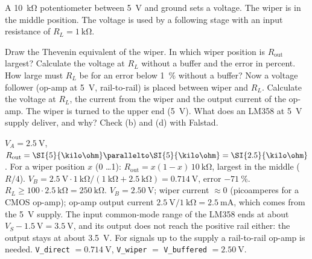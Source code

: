 \label{ex:oab-pot}
A \SI{10}{\kilo\ohm} potentiometer between \SI{5}{\volt} and ground sets a voltage.
The wiper is in the middle position. The voltage is used by a following stage
with an input resistance of $R_L = \SI{1}{\kilo\ohm}$.
\begin{talist}
\ta Draw the Thevenin equivalent of the wiper. In which wiper position is $R_\mathrm{out}$ largest?
\ta Calculate the voltage at $R_L$ without a buffer and the error in percent.
\ta How large must $R_L$ be for an error below \SI{1}{\percent} without a buffer?
\ta Now a voltage follower (op-amp at \SI{5}{\volt}, rail-to-rail) is placed between wiper and $R_L$.
    Calculate the voltage at $R_L$, the current from the wiper and the output current of the op-amp.
\ta The wiper is turned to the upper end (\SI{5}{\volt}). What does an LM358 at \SI{5}{\volt} supply deliver, and why?
\ta Check (b) and (d) with Falstad.
\end{talist}

\begin{solution}
\begin{talist}
\ta $V_A = \SI{2.5}{\volt}$, $R_\mathrm{out} = \SI{5}{\kilo\ohm}\parallelto\SI{5}{\kilo\ohm} = \SI{2.5}{\kilo\ohm}$.
    For a wiper position $x$ (0 \ldots 1): $R_\mathrm{out} = x(1-x)\,\SI{10}{\kilo\ohm}$, largest in the middle ($R/4$).
\ta $V_B = \SI{2.5}{\volt}\cdot\SI{1}{\kilo\ohm}/(\SI{1}{\kilo\ohm}+\SI{2.5}{\kilo\ohm}) = \SI{0.714}{\volt}$, error $-\SI{71}{\percent}$.
\ta $R_L \geq 100\cdot\SI{2.5}{\kilo\ohm} = \SI{250}{\kilo\ohm}$.
\ta $V_B = \SI{2.50}{\volt}$; wiper current $\approx 0$ (picoamperes for a CMOS op-amp);
    op-amp output current $\SI{2.5}{\volt}/\SI{1}{\kilo\ohm} = \SI{2.5}{\milli\ampere}$, which comes from the \SI{5}{\volt} supply.
\ta The input common-mode range of the LM358 ends at about $V_S-\SI{1.5}{\volt} = \SI{3.5}{\volt}$, and its output
    does not reach the positive rail either: the output stays at about \SI{3.5}{\volt}. For signals up to the supply
    a rail-to-rail op-amp is needed.
\ta {}\newline \texttt{V\_direct} $=\SI{0.714}{\volt}$, \texttt{V\_wiper} $=$ \texttt{V\_buffered} $=\SI{2.50}{\volt}$.
\end{talist}
\end{solution}

